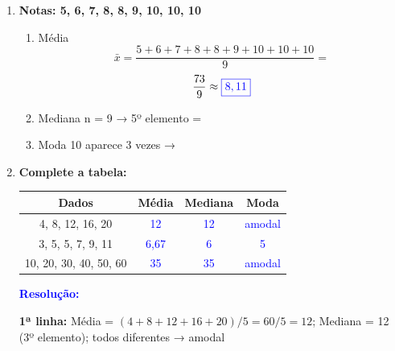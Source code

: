 \documentclass[11pt]{article}
\newcommand{\respostaNum}[1]{\textcolor{blue}{\boxed{#1}}}
\newcommand{\respostaTxt}[1]{\textcolor{blue}{#1}}
\newcommand{\resolucao}{\textbf{\textcolor{blue}{Resolução:}}}
\begin{document}
\begin{multicols}{2}
\begin{enumerate}[leftmargin=*, start=7]
\begin{enumerate}[label=\alph*)]
\item Média
\[
    \bar{x} = \frac{1800+2000+2200+2500+5000}{5} \]
\[= \frac{13500}{5} = \respostaNum{R\$ 2700} \]

\item Mediana

\textbf{Ordenando:} 1800, 2000, 2200, 2500, 5000 \\
n = 5 → 3º elemento = \respostaNum{R\$ 2200}

\item Melhor representação

\resolucao
A \respostaTxt{mediana (R\$ 2200)} representa melhor, pois a média (R\$ 2700) é puxada para cima pelo salário extremo de R\$ 5000.
\end{enumerate}

\item \textbf{Notas: 5, 6, 7, 8, 8, 9, 10, 10, 10}

\begin{enumerate}[label=\alph*)]
\item Média
\[\bar{x} = \frac{5+6+7+8+8+9+10+10+10}{9} = \]
\[\frac{73}{9} \approx \respostaNum{8,11} \]

\item Mediana
n = 9 → 5º elemento = \respostaNum{8}

\item Moda
10 aparece 3 vezes → \respostaNum{10}
\end{enumerate}

\item \textbf{Complete a tabela:}

\begin{center}
    \small
\begin{tabular}{|c|c|c|c|}
\hline
\textbf{Dados} & \textbf{Média} & \textbf{Mediana} & \textbf{Moda} \\
\hline
4, 8, 12, 16, 20 & \textcolor{blue}{12} & \textcolor{blue}{12} & \textcolor{blue}{amodal} \\
\hline
3, 5, 5, 7, 9, 11 & \textcolor{blue}{6,67} & \textcolor{blue}{6} & \textcolor{blue}{5} \\
\hline
10, 20, 30, 40, 50, 60 & \textcolor{blue}{35} & \textcolor{blue}{35} & \textcolor{blue}{amodal} \\
\hline
\end{tabular}
\end{center}

\resolucao

\textbf{1ª linha:} Média = $(4+8+12+16+20)/5 = 60/5 = 12$; Mediana = 12 (3º elemento); todos diferentes → amodal


\end{enumerate}
\end{multicols}
\end{document}
